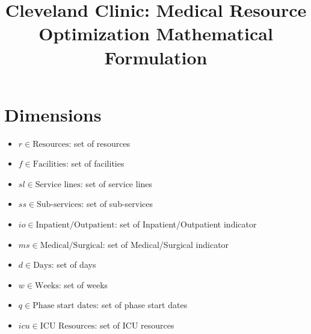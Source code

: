 \documentclass[10pt, letterpaper]{article}
\begin{document}
\title{Cleveland Clinic: Medical Resource Optimization Mathematical Formulation}
\maketitle

\section*{Dimensions}
\begin{itemize}
\item[ ] $ r \in \text{Resources}$: set of resources
\item[ ] $ f \in \text{Facilities}$: set of facilities
\item[ ] $ sl \in \text{Service lines}$: set of service lines
\item[ ] $ ss \in \text{Sub-services}$: set of sub-services
\item[ ] $ io \in \text{Inpatient/Outpatient}$: set of Inpatient/Outpatient indicator
\item[ ] $ ms \in \text{Medical/Surgical}$: set of Medical/Surgical indicator
\item[ ] $ d \in \text{Days}$: set of days
\item[ ] $ w \in \text{Weeks}$: set of weeks
\item[ ] $ q \in \text{Phase start dates}$: set of phase start dates
\item[ ] $ icu \in \text{ICU Resources}$: set of ICU resources
\end{itemize}
\end{document}
